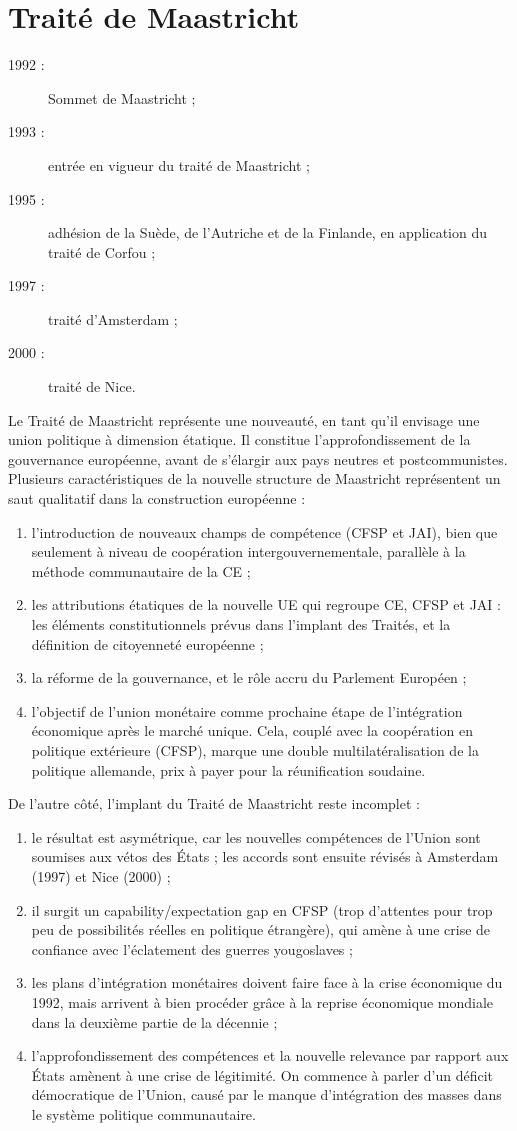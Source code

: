 \documentclass{report}%
\begin{document}
\section{Traité de Maastricht}
	\begin{description}
		\item [1992 :] Sommet de Maastricht ;
		\item [1993 :] entrée en vigueur du traité de Maastricht ;
		\item [1995 :] adhésion de la Suède, de l'Autriche et de la Finlande, en application du traité de Corfou ;
		\item [1997 :] traité d'Amsterdam ;
		\item [2000 :] traité de Nice.
	\end{description}
Le Traité de Maastricht représente une nouveauté, en tant qu’il envisage une union politique à dimension étatique. Il constitue l’approfondissement de la gouvernance européenne, avant de s’élargir aux pays neutres et postcommunistes. Plusieurs caractéristiques de la nouvelle structure de Maastricht représentent un saut qualitatif dans la construction européenne :
	\begin{enumerate}
		\item l’introduction de nouveaux champs de compétence (CFSP et JAI), bien que seulement à niveau de coopération intergouvernementale, parallèle à la méthode communautaire de la CE ;
		\item les attributions étatiques de la nouvelle UE qui regroupe CE, CFSP et JAI : les éléments constitutionnels prévus dans l’implant des Traités, et la définition de citoyenneté européenne ;
		\item la réforme de la gouvernance, et le rôle accru du Parlement Européen ;
		\item l’objectif de l’union monétaire comme prochaine étape de l’intégration économique après le marché unique. Cela, couplé avec la coopération en politique extérieure (CFSP), marque une double multilatéralisation de la politique allemande, prix à payer pour la réunification soudaine.
	\end{enumerate}
De l’autre côté, l’implant du Traité de Maastricht reste incomplet :
	\begin{enumerate}
		\item le résultat est asymétrique, car les nouvelles compétences de l’Union sont soumises aux vétos des États ; les accords sont ensuite révisés à Amsterdam (1997) et Nice (2000) ;
		\item il surgit un capability/expectation gap en CFSP (trop d’attentes pour trop peu de possibilités réelles en politique étrangère), qui amène à une crise de confiance avec l’éclatement des guerres yougoslaves ;
		\item les plans d’intégration monétaires doivent faire face à la crise économique du 1992, mais arrivent à bien procéder grâce à la reprise économique mondiale dans la deuxième partie de la décennie ;
		\item l’approfondissement des compétences et la nouvelle relevance par rapport aux États amènent à une crise de légitimité. On commence à parler d’un déficit démocratique de l’Union, causé par le manque d’intégration des masses dans le système politique communautaire.
	\end{enumerate}
\end{document}
